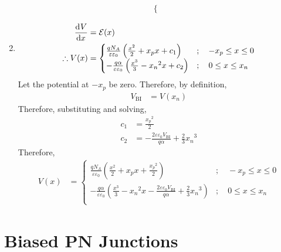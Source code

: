 \documentclass[titlepage, fleqn, a4paper, 12pt, twoside]{article}
\theoremstyle{definition}
\theoremstyle{theorem}
\begin{document}
\begin{solution}
\begin{enumerate}[leftmargin=*]
\begin{align*}
\begin{cases}
					\end{cases}
			\end{align*}
		\item
			\begin{align*}
				\dod{V}{x} &= \mathcal{E}(x)\\
				\therefore V(x) &=
					\begin{cases}
						\frac{q N_A}{\varepsilon \varepsilon_0} \left( \frac{x^2}{2} + x_p x + c_1 \right)         & ;\quad -x_p \le x \le 0 \\
						-\frac{q \alpha}{\varepsilon \varepsilon_0} \left( \frac{x^3}{3} - {x_n}^2 x + c_2 \right) & ;\quad 0 \le x \le x_n  \\
					\end{cases}
			\end{align*}
			Let the potential at $-x_p$ be zero.
			Therefore, by definition,
			\begin{align*}
				V_{\text{BI}} & = V(x_n)
			\end{align*}
			Therefore, substituting and solving,
			\begin{align*}
				c_1 & = \frac{{x_p}^2}{2} \\
				c_2 & = -\frac{2 \varepsilon \varepsilon_0 V_{\text{BI}}}{q \alpha} + \frac{2}{3} {x_n}^3
			\end{align*}
			Therefore,
			\begin{align*}
				V(x) &=
					\begin{cases}
						\frac{q N_A}{\varepsilon \varepsilon_0} \left( \frac{x^2}{2} + x_p x + \frac{{x_p}^2}{2} \right)                                                                        & ;\quad -x_p \le x \le 0 \\
						-\frac{q \alpha}{\varepsilon \varepsilon_0} \left( \frac{x^3}{3} - {x_n}^2 x - \frac{2 \varepsilon \varepsilon_0 V_{\text{BI}}}{q \alpha} + \frac{2}{3} {x_n}^3 \right) & ;\quad 0 \le x \le x_n  \\
					\end{cases}
			\end{align*}
	\end{enumerate}
\end{solution}

\section{Biased PN Junctions}
\end{document}
